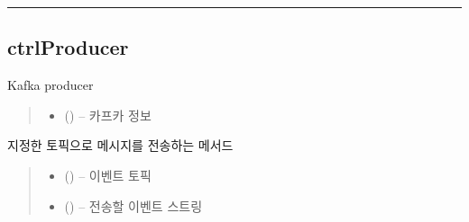 \documentclass[a4paper,10pt,english]{sphinxmanual}
\begin{document}
\bigskip\hrule\bigskip



\subsection{ctrlProducer}
\label{\detokenize{_ctrlKafka:ctrlproducer}}

\begin{fulllineitems}
\label{\detokenize{_ctrlKafka:ctrlProducer}}
\pysigstartsignatures
{}
\pysigstopsignatures
\sphinxAtStartPar
Kafka producer
\begin{quote}\begin{description}
\begin{itemize}
\item {} 
\sphinxAtStartPar
{} () – 카프카 정보

\end{itemize}

\end{description}\end{quote}

\begin{fulllineitems}
\label{\detokenize{_ctrlKafka:ctrlProducer._produce}}
\pysigstartsignatures
{}
\pysigstopsignatures
\sphinxAtStartPar
지정한 토픽으로 메시지를 전송하는 메서드
\begin{quote}\begin{description}
\begin{itemize}
\item {} 
\sphinxAtStartPar
{} () – 이벤트 토픽

\item {} 
\sphinxAtStartPar
{} () – 전송할 이벤트 스트링


\end{itemize}
\end{description}
\end{quote}
\end{fulllineitems}
\end{fulllineitems}
\end{document}
